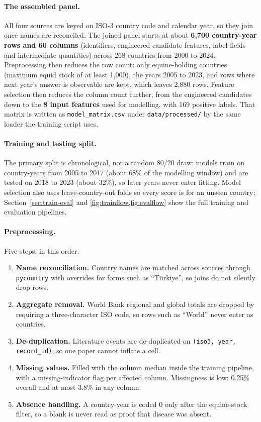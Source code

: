 \documentclass[10pt,openany]{report}
\begin{document}
\paragraph{The assembled panel.}
All four sources are keyed on ISO-3 country code and calendar year, so they join once names are
reconciled. The joined panel starts at about \textbf{6,700 country-year rows and 60 columns}
(identifiers, engineered candidate features, label fields and intermediate quantities) across 268
countries from 2000 to 2024. Preprocessing then reduces the row count: only equine-holding countries
(maximum equid stock of at least 1{,}000), the years 2005 to 2023, and rows where next year's answer
is observable are kept, which leaves 2,880 rows. Feature selection then reduces the column count
further, from the engineered candidates down to the \textbf{8 input features} used for modelling,
with 169 positive labels. That matrix is written as \texttt{model\_matrix.csv} under
\texttt{data/processed/} by the same loader the training script uses.

\paragraph{Training and testing split.}
The primary split is chronological, not a random 80/20 draw: models train on country-years from
2005 to 2017 (about 68\% of the modelling window) and are tested on 2018 to 2023 (about 32\%), so
later years never enter fitting. Model selection also uses leave-country-out folds so every score is
for an unseen country; Section~\ref{sec:train-eval} and \cref{fig:trainflow,fig:evalflow} show the full training and evaluation pipelines.

\paragraph{Preprocessing.}
Five steps, in this order.

\begin{enumerate}
\setlength{\itemsep}{0.1em}
\item \textbf{Name reconciliation.} Country names are matched across sources through
      \texttt{pycountry} with overrides for forms such as ``T\"urkiye'', so joins do not silently
      drop rows.
\item \textbf{Aggregate removal.} World Bank regional and global totals are dropped by requiring a
      three-character ISO code, so rows such as ``World'' never enter as countries.
\item \textbf{De-duplication.} Literature events are de-duplicated on
      \texttt{(iso3, year, record\_id)}, so one paper cannot inflate a cell.
\item \textbf{Missing values.} Filled with the column median inside the training pipeline, with a
      missing-indicator flag per affected column. Missingness is low: 0.25\% overall and at most
      3.8\% in any column.
\item \textbf{Absence handling.} A country-year is coded 0 only after the equine-stock filter, so a
      blank is never read as proof that disease was absent.
\end{enumerate}
\end{document}
